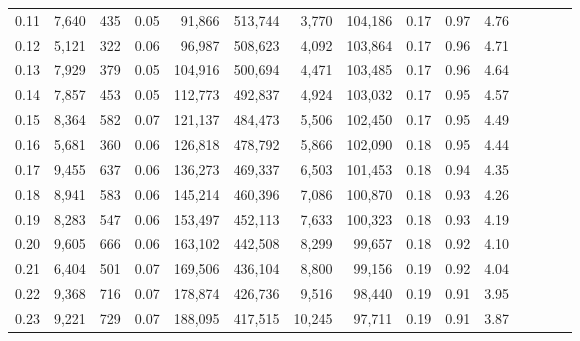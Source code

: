 \begin{tabular}{rrrcrrrrrrrrrrr}
0.11 &   7,640 &    435 &                                       0.05 &   91,866 &  513,744 &    3,770 &  104,186 &  0.17 &  0.97 &                         4.76 \\
0.12 &   5,121 &    322 &                                       0.06 &   96,987 &  508,623 &    4,092 &  103,864 &  0.17 &  0.96 &                         4.71 \\
0.13 &   7,929 &    379 &                                       0.05 &  104,916 &  500,694 &    4,471 &  103,485 &  0.17 &  0.96 &                         4.64 \\
0.14 &   7,857 &    453 &                                       0.05 &  112,773 &  492,837 &    4,924 &  103,032 &  0.17 &  0.95 &                         4.57 \\
0.15 &   8,364 &    582 &                                       0.07 &  121,137 &  484,473 &    5,506 &  102,450 &  0.17 &  0.95 &                         4.49 \\
0.16 &   5,681 &    360 &                                       0.06 &  126,818 &  478,792 &    5,866 &  102,090 &  0.18 &  0.95 &                         4.44 \\
0.17 &   9,455 &    637 &                                       0.06 &  136,273 &  469,337 &    6,503 &  101,453 &  0.18 &  0.94 &                         4.35 \\
0.18 &   8,941 &    583 &                                       0.06 &  145,214 &  460,396 &    7,086 &  100,870 &  0.18 &  0.93 &                         4.26 \\
0.19 &   8,283 &    547 &                                       0.06 &  153,497 &  452,113 &    7,633 &  100,323 &  0.18 &  0.93 &                         4.19 \\
0.20 &   9,605 &    666 &                                       0.06 &  163,102 &  442,508 &    8,299 &   99,657 &  0.18 &  0.92 &                         4.10 \\
0.21 &   6,404 &    501 &                                       0.07 &  169,506 &  436,104 &    8,800 &   99,156 &  0.19 &  0.92 &                         4.04 \\
0.22 &   9,368 &    716 &                                       0.07 &  178,874 &  426,736 &    9,516 &   98,440 &  0.19 &  0.91 &                         3.95 \\
0.23 &   9,221 &    729 &                                       0.07 &  188,095 &  417,515 &   10,245 &   97,711 &  0.19 &  0.91 &                         3.87 \\

\end{tabular}
